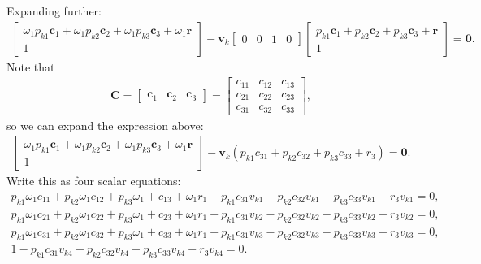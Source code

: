 \documentclass{article}
\begin{document}
Expanding further:
\begin{align}
    \begin{bmatrix}\omega_1 p_{k1} \mathbf{c}_1 + \omega_1 p_{k2} \mathbf{c}_2 + \omega_1 p_{k3} \mathbf{c}_3 + \omega_1 \mathbf{r} \\ 1\end{bmatrix} - \mathbf{v}_k \begin{bmatrix} 0 & 0 & 1 & 0 \end{bmatrix} \begin{bmatrix} p_{k1} \mathbf{c}_1 + p_{k2} \mathbf{c}_2 + p_{k3} \mathbf{c}_3 + \mathbf{r} \\ 1\end{bmatrix} = \mathbf{0}.
\end{align}
Note that
\begin{align}
    \mathbf{C} = \begin{bmatrix} \mathbf{c}_1 & \mathbf{c}_2 & \mathbf{c}_3\end{bmatrix} = \begin{bmatrix} c_{11} & c_{12} & c_{13} \\ c_{21} & c_{22} & c_{23} \\ c_{31} & c_{32} & c_{33} \end{bmatrix},
\end{align}
so we can expand the expression above:
\begin{align}
    \begin{bmatrix}\omega_1 p_{k1} \mathbf{c}_1 + \omega_1 p_{k2} \mathbf{c}_2 + \omega_1 p_{k3} \mathbf{c}_3 + \omega_1 \mathbf{r} \\ 1\end{bmatrix} - \mathbf{v}_k (p_{k1}c_{31} + p_{k2} c_{32} + p_{k3} c_{33} + r_3) = \mathbf{0}.
\end{align}
Write this as four scalar equations:
\begin{align}
    p_{k1} \omega_1 c_{11} + p_{k2} \omega_1 c_{12} + p_{k3} \omega_1 + c_{13} + \omega_1 r_1 - p_{k1} c_{31} v_{k1}- p_{k2} c_{32} v_{k1} - p_{k3} c_{33} v_{k1} - r_3 v_{k1}= 0,\\
    p_{k1} \omega_1 c_{21} + p_{k2} \omega_1 c_{22} + p_{k3} \omega_1 + c_{23} + \omega_1 r_1 - p_{k1} c_{31} v_{k2}- p_{k2} c_{32} v_{k2} - p_{k3} c_{33} v_{k2} - r_3 v_{k2}= 0,\\
    p_{k1} \omega_1 c_{31} + p_{k2} \omega_1 c_{32} + p_{k3} \omega_1 + c_{33} + \omega_1 r_1 - p_{k1} c_{31} v_{k3}- p_{k2} c_{32} v_{k3} - p_{k3} c_{33} v_{k3} - r_3 v_{k3}= 0,\\
    1 - p_{k1} c_{31} v_{k4}- p_{k2} c_{32} v_{k4} - p_{k3} c_{33} v_{k4} - r_3 v_{k4}= 0.
\end{align}
\end{document}
